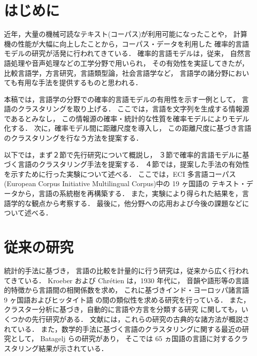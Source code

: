 

\maketitle



\section{はじめに}

近年，大量の機械可読なテキスト(コーパス)が利用可能になったことや，
計算機の性能が大幅に向上したことから，コーパス・データを利用した
確率的言語モデルの研究が活発に行われてきている．
確率的言語モデルは，従来，
自然言語処理や音声処理などの工学分野で用いられ，
その有効性を実証してきたが，
比較言語学，方言研究，言語類型論，社会言語学など，
言語学の諸分野においても有用な手法を提供するものと思われる．

本稿では，言語学の分野での確率的言語モデルの有用性を示す一例として，
言語のクラスタリングを取り上げる．
ここでは，言語を文字列を生成する情報源であるとみなし，
この情報源の確率・統計的な性質を確率モデルによりモデル化する．
次に，確率モデル間に距離尺度を導入し，
この距離尺度に基づき言語のクラスタリングを行なう方法を提案する．

以下では，まず２節で先行研究について概説し，
３節で確率的言語モデルに基づく言語のクラスタリング手法を提案する．
４節では，提案した手法の有効性を示すために行った実験について述べる．
ここでは，ECI 多言語コーパス
(European Corpus Initiative Multilingual Corpus)中の 19 ヶ国語の
テキスト・データから，言語の系統樹を再構築する．
また，実験により得られた結果を，言語学的な観点から考察する．
最後に，他分野への応用および今後の課題などについて述べる．


\section{従来の研究}

統計的手法に基づき，
言語の比較を計量的に行う研究は，従来から広く行われてきている．
Kroeber および Chr\'{e}tien は，1930 年代に，
音韻や語形等の言語的特徴から言語間の相関係数を求め，
これに基づきインド・ヨーロッパ諸言語 9 ヶ国語およびヒッタイト語
の間の類似性を求める研究を行っている\cite{Kroeber37,Kroeber39}．
また，クラスター分析に基づき，自動的に言語や方言を分類する研究
に関しても，いくつかの先行研究がある．
文献\cite{Yasumoto95Book}には，これらの研究の古典的な諸方法が概説されている．
また，数学的手法に基づく言語のクラスタリングに関する最近の研究として，
Batagelj らの研究\cite{Batagelj92}があり，
そこでは 65 ヵ国語の言語に対するクラスタリング結果が示されている．

